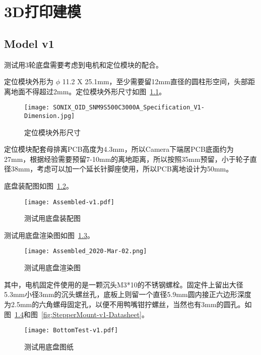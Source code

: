 \chapter{3D打印建模}
\label{cha:Model}

\section{Model v1}

测试用3轮底盘需要考虑到电机和定位模块的配合。

定位模块外形为 $\phi$ 11.2 X 25.1mm，至少需要留12mm直径的圆柱形空间，头部距离地面不得超过2mm。定位模块外形尺寸如图~\ref{fig:Camera-Dimension}。

\begin{figure}[htbp]
    \centering
    \texttt{[image: SONIX\_OID\_SNM9S500C3000A\_Specification\_V1-Dimension.jpg]}
    \caption{定位模块外形尺寸}
    \label{fig:Camera-Dimension}
\end{figure}

定位模块配套母排离PCB高度为4.3mm，所以Camera下端居PCB底面约为27mm，根据经验需要预留7-10mm的离地距离，所以按照35mm预留，小于轮子直径38mm，考虑可以加一个延长针脚座使用，所以PCB离地设计为50mm。


底盘装配图如图~\ref{fig:Assembled-Test-Datasheet}。

\begin{figure}[htbp]
    \centering
    \texttt{[image: Assembled-v1.pdf]}
    \caption{测试用底盘装配图}
    \label{fig:Assembled-Test-Datasheet}
\end{figure}

测试用底盘渲染图如图~\ref{fig:Assembled-Test-Render}。

\begin{figure}[htbp]
    \centering
    \texttt{[image: Assembled\_2020-Mar-02.png]}
    \caption{测试用底盘渲染图}
    \label{fig:Assembled-Test-Render}
\end{figure}

其中，电机固定件使用的是一颗沉头M3*10的不锈钢螺栓。固定件上留出大径5.3mm小径3mm的沉头螺丝孔，底板上则留一个直径5.9mm圆内接正六边形深度为2.5mm的六角螺母固定孔，以便不用鸭嘴钳拧螺丝，当然也有3mm的圆孔。如图~\ref{fig:BottomTest-v1-Datasheet}和图~\ref{fig:StepperMount-v1-Datasheet}。

\begin{figure}[htbp]
    \centering
    \texttt{[image: BottomTest-v1.pdf]}
    \caption{测试用底盘图纸}
    \label{fig:BottomTest-v1-Datasheet}
\end{figure}

